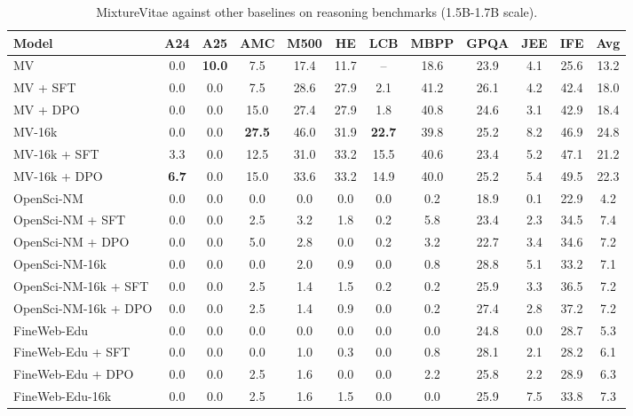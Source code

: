 \begin{table}[ht]
\centering
\caption{MixtureVitae against other baselines on reasoning benchmarks (1.5B-1.7B scale).}
\label{tab:evalchemy_table2}
\scriptsize
\begin{tabular}{lccccccccccc}
\toprule
\textbf{Model} & \textbf{A24} & \textbf{A25} & \textbf{AMC} & \textbf{M500} & \textbf{HE} & \textbf{LCB} & \textbf{MBPP} & \textbf{GPQA} & \textbf{JEE} & \textbf{IFE} & \textbf{Avg} \\
\midrule
MV & 0.0 & \textbf{10.0} & 7.5 & 17.4 & 11.7 & -- & 18.6 & 23.9 & 4.1 & 25.6 & 13.2 \\
MV + SFT & 0.0 & 0.0 & 7.5 & 28.6 & 27.9 & 2.1 & 41.2 & 26.1 & 4.2 & 42.4 & 18.0 \\
MV + DPO & 0.0 & 0.0 & 15.0 & 27.4 & 27.9 & 1.8 & 40.8 & 24.6 & 3.1 & 42.9 & 18.4 \\
\midrule
\addlinespace[0.3em]
MV-16k & 0.0 & 0.0 & \textbf{27.5} & 46.0 & 31.9 & \textbf{22.7} & 39.8 & 25.2 & 8.2 & 46.9 & 24.8 \\
MV-16k + SFT & 3.3 & 0.0 & 12.5 & 31.0 & 33.2 & 15.5 & 40.6 & 23.4 & 5.2 & 47.1 & 21.2 \\
MV-16k + DPO & \textbf{6.7} & 0.0 & 15.0 & 33.6 & 33.2 & 14.9 & 40.0 & 25.2 & 5.4 & 49.5 & 22.3 \\
\midrule
\addlinespace[0.3em]
OpenSci-NM & 0.0 & 0.0 & 0.0 & 0.0 & 0.0 & 0.0 & 0.2 & 18.9 & 0.1 & 22.9 & 4.2 \\
OpenSci-NM + SFT & 0.0 & 0.0 & 2.5 & 3.2 & 1.8 & 0.2 & 5.8 & 23.4 & 2.3 & 34.5 & 7.4 \\
OpenSci-NM + DPO & 0.0 & 0.0 & 5.0 & 2.8 & 0.0 & 0.2 & 3.2 & 22.7 & 3.4 & 34.6 & 7.2 \\
\midrule
\addlinespace[0.3em]
OpenSci-NM-16k & 0.0 & 0.0 & 0.0 & 2.0 & 0.9 & 0.0 & 0.8 & 28.8 & 5.1 & 33.2 & 7.1 \\
OpenSci-NM-16k + SFT & 0.0 & 0.0 & 2.5 & 1.4 & 1.5 & 0.2 & 0.2 & 25.9 & 3.3 & 36.5 & 7.2 \\
OpenSci-NM-16k + DPO & 0.0 & 0.0 & 2.5 & 1.4 & 0.9 & 0.0 & 0.2 & 27.4 & 2.8 & 37.2 & 7.2 \\
\midrule
\addlinespace[0.3em]
FineWeb-Edu & 0.0 & 0.0 & 0.0 & 0.0 & 0.0 & 0.0 & 0.0 & 24.8 & 0.0 & 28.7 & 5.3 \\
FineWeb-Edu + SFT & 0.0 & 0.0 & 0.0 & 1.0 & 0.3 & 0.0 & 0.8 & 28.1 & 2.1 & 28.2 & 6.1 \\
FineWeb-Edu + DPO & 0.0 & 0.0 & 2.5 & 1.6 & 0.0 & 0.0 & 2.2 & 25.8 & 2.2 & 28.9 & 6.3 \\
\midrule
\addlinespace[0.3em]
FineWeb-Edu-16k & 0.0 & 0.0 & 2.5 & 1.6 & 1.5 & 0.0 & 0.0 & 25.9 & 7.5 & 33.8 & 7.3 \\

\end{tabular}
\end{table}
